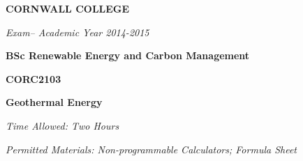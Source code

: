 \documentclass[a4paper,12pt,fleqn]{article}
\newcommand{\institution}{CORNWALL COLLEGE}
\newcommand{\titlehd}{BSc Renewable Energy and Carbon Management}
\newcommand{\examtype}{Exam}
\newcommand{\examdate}{Academic Year 2014-2015}
\newcommand{\examcode}{CORC2103}
\newcommand{\examtitle}{Geothermal Energy}
\newcommand{\readtime}{15 Minutes}
\newcommand{\writetime}{Two Hours}
\newcommand{\materials}{Non-programmable Calculators; Formula Sheet}
\begin{document}

\begin{center}
\large\textbf{\institution}
\end{center}
\vspace{1cm}

\begin{center}
\textit{ \examtype -- \examdate}
\end{center}
\vspace{1cm}

\begin{center}
\large\textbf{\titlehd}
\end{center}

\begin{center}
\large\textbf{\examcode}
\end{center}
\begin{center}
\large\textbf{\examtitle}
\end{center}
\vspace{4cm}
\vspace{4cm}

\begin{center}
\end{center}
\begin{center}
\textit{Time Allowed:  \writetime}
\end{center}
\begin{center}
\textit{Permitted Materials: \materials}
\end{center}
\end{document}
